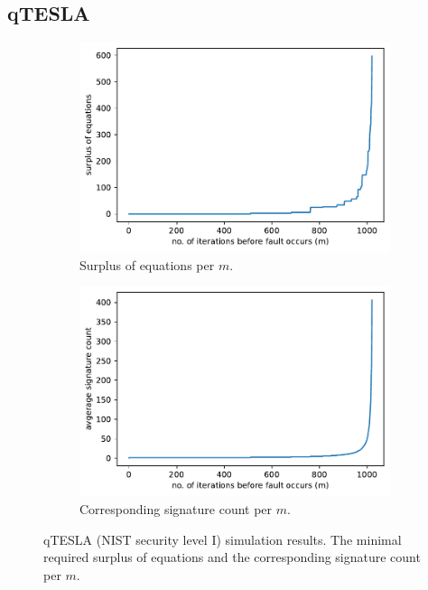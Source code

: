 \subsection{qTESLA}

\begin{figure}[p]
\centering
\begin{subfigure}{.5\textwidth}
  \centering
  
\includegraphics[width=.9\linewidth]{plots/server_qtesla_i_surplus}%
  \caption{Surplus of equations per $m$.}
  \label{fig:resqteslasurplus}
\end{subfigure}%
\begin{subfigure}{.5\textwidth}
  \centering
\includegraphics[width=.9\linewidth]{plots/server_qtesla_i_sigcount_surplus}%
  \caption{Corresponding signature count per $m$.}
  \label{fig:resqteslasigs}
\end{subfigure}

\caption{qTESLA (NIST security level I) simulation results. The minimal required surplus of equations and the corresponding signature count per $m$.}
\label{fig:resqtesla}
\end{figure}



